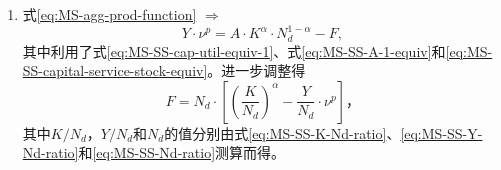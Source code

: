 \begin{enumerate}
\item 式\eqref{eq:MS-agg-prod-function} $\Rightarrow$
\begin{equation*}
Y \cdot \nu^p = A \cdot K^{\alpha} \cdot N_d^{1-\alpha} - F,
\end{equation*}
其中利用了式\eqref{eq:MS-SS-cap-util-equiv-1}、式\eqref{eq:MS-SS-A-1-equiv}和\eqref{eq:MS-SS-capital-service-stock-equiv}。进一步调整得
\begin{equation}
\label{eq:MS-SS-fixed-cost}
F = N_d \cdot \left[ \left( \frac{K}{N_d} \right)^{\alpha} - \frac{Y}{N_d} \cdot \nu^p \right]，
\end{equation}
其中$K/N_d$，$Y/N_d$和$N_d$的值分别由式\eqref{eq:MS-SS-K-Nd-ratio}、\eqref{eq:MS-SS-Y-Nd-ratio}和\eqref{eq:MS-SS-Nd-ratio}测算而得。








































\end{enumerate}


